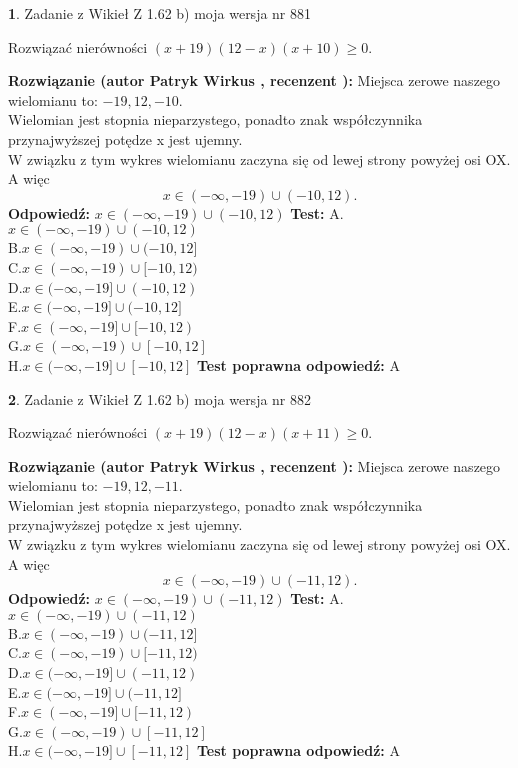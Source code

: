 \documentclass[12pt, a4paper]{article}
\theoremstyle{definition} %
\newtheorem{zad}{}
\newcommand{\zadStart}[1]{\begin{zad}#1\newline}
\newcommand{\zadStop}{\end{zad}}
\newcommand{\rozwStart}[2]{\noindent \textbf{Rozwiązanie (autor #1 , recenzent #2): }\newline}
\newcommand{\rozwStop}{\newline}
\newcommand{\odpStart}{\noindent \textbf{Odpowiedź:}\newline}
\newcommand{\odpStop}{\newline}
\newcommand{\testStart}{\noindent \textbf{Test:}\newline}
\newcommand{\testStop}{\newline}
\newcommand{\kluczStart}{\noindent \textbf{Test poprawna odpowiedź:}\newline}
\newcommand{\kluczStop}{\newline}
\begin{document}
\zadStart{Zadanie z Wikieł Z 1.62 b) moja wersja nr 881}

Rozwiązać nierówności $(x+19)(12-x)(x+10)\ge0$.
\zadStop
\rozwStart{Patryk Wirkus}{}
Miejsca zerowe naszego wielomianu to: $-19, 12, -10$.\\
Wielomian jest stopnia nieparzystego, ponadto znak współczynnika przy\linebreak najwyższej potędze x jest ujemny.\\ W związku z tym wykres wielomianu zaczyna się od lewej strony powyżej osi OX. A więc $$x \in (-\infty,-19) \cup (-10,12).$$
\rozwStop
\odpStart
$x \in (-\infty,-19) \cup (-10,12)$
\odpStop
\testStart
A.$x \in (-\infty,-19) \cup (-10,12)$\\
B.$x \in (-\infty,-19) \cup (-10,12]$\\
C.$x \in (-\infty,-19) \cup [-10,12)$\\
D.$x \in (-\infty,-19] \cup (-10,12)$\\
E.$x \in (-\infty,-19] \cup (-10,12]$\\
F.$x \in (-\infty,-19] \cup [-10,12)$\\
G.$x \in (-\infty,-19) \cup [-10,12]$\\
H.$x \in (-\infty,-19] \cup [-10,12]$
\testStop
\kluczStart
A
\kluczStop



\zadStart{Zadanie z Wikieł Z 1.62 b) moja wersja nr 882}

Rozwiązać nierówności $(x+19)(12-x)(x+11)\ge0$.
\zadStop
\rozwStart{Patryk Wirkus}{}
Miejsca zerowe naszego wielomianu to: $-19, 12, -11$.\\
Wielomian jest stopnia nieparzystego, ponadto znak współczynnika przy\linebreak najwyższej potędze x jest ujemny.\\ W związku z tym wykres wielomianu zaczyna się od lewej strony powyżej osi OX. A więc $$x \in (-\infty,-19) \cup (-11,12).$$
\rozwStop
\odpStart
$x \in (-\infty,-19) \cup (-11,12)$
\odpStop
\testStart
A.$x \in (-\infty,-19) \cup (-11,12)$\\
B.$x \in (-\infty,-19) \cup (-11,12]$\\
C.$x \in (-\infty,-19) \cup [-11,12)$\\
D.$x \in (-\infty,-19] \cup (-11,12)$\\
E.$x \in (-\infty,-19] \cup (-11,12]$\\
F.$x \in (-\infty,-19] \cup [-11,12)$\\
G.$x \in (-\infty,-19) \cup [-11,12]$\\
H.$x \in (-\infty,-19] \cup [-11,12]$
\testStop
\kluczStart
A
\kluczStop
\end{document}
